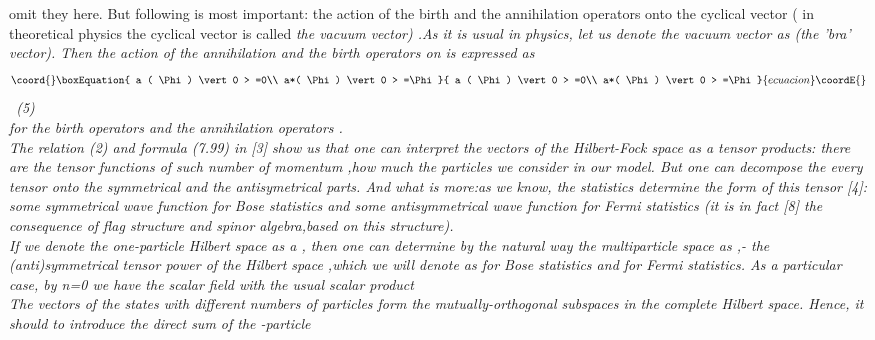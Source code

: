 \documentclass[a4paper,12pt] {article}
\begin{document}
 omit they here. But following is most important: the action of the birth and  the annihilation  operators
onto  the cyclical vector ( in theoretical physics the cyclical vector is called  \it the vacuum vector\rm) .As it is usual in physics, let us denote the  vacuum vector as \coordHE{}  (\it the  'bra' vector\rm). Then
the  action of the  annihilation and the birth operators on \coordHE{} is expressed as
\\ \begin{equation}\coord{}\boxEquation{ a ( \Phi ) \vert 0 > =0\\  a*(
 \Phi ) \vert 0 > =\Phi  
}{ a ( \Phi ) \vert 0 > =0\\  a*(
 \Phi ) \vert 0 > =\Phi  
}{ecuacion}\coordE{}\end{equation} \   (5) \\ for the birth operators  \coordHE{} and the  annihilation operators
  \coordHE{}.\\ The relation (2) and formula (7.99) in [3] show us  that one can interpret the vectors of the
 Hilbert-Fock space as a \it  tensor products\rm : there are the  \it  tensor functions of such number of
 momentum ,how much the particles we consider in our model.
\rm But one can decompose the every tensor onto  \it the symmetrical and the antisymetrical parts.
 \rm And what is more:as we  know, the  statistics determine the form of this tensor [4]: some symmetrical
 wave function for Bose statistics and some antisymmetrical wave function for Fermi statistics (it is in
 fact [8] the consequence of  flag structure  and  spinor algebra,based on this structure).
\\ If we denote the one-particle  Hilbert space as a \coordHE{}, then one can determine by the natural
way the multiparticle space   as
 \coordHE{} ,- \it the \coordHE{}\it  (anti)symmetrical  tensor power  of the  Hilbert space
\coordHE{},\rm which we will denote as  \coordHE{} for Bose statistics and
 \coordHE{} for Fermi statistics.
 As a particular case, by n=0 we have the scalar field with the usual scalar product \coordHE{}
\\ The vectors of the  states with different numbers of particles form the  mutually-orthogonal subspaces
 in the complete Hilbert  space. Hence, \it it should to introduce the direct sum of the \coordHE{}-\it particle
\end{document}
